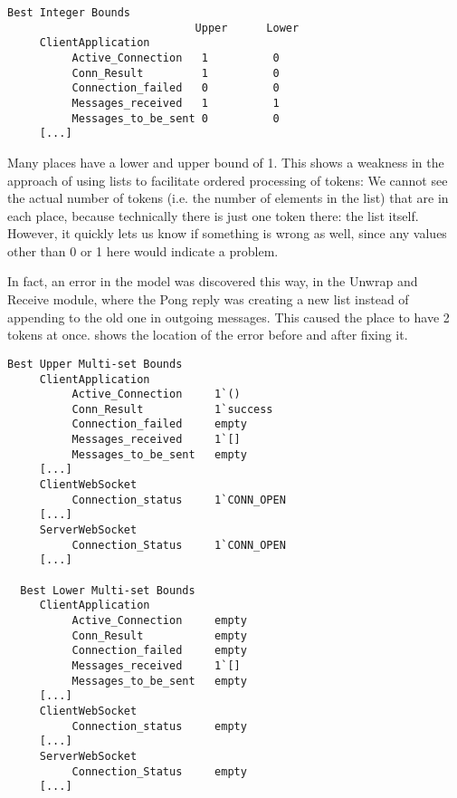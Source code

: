 	\begin{lstlisting}[language={},float=h,label=lst:ssa_bib,
	caption=State Space Report: Best Integer Bounds]
    Best Integer Bounds
                             Upper      Lower
     ClientApplication
          Active_Connection   1          0
          Conn_Result         1          0
          Connection_failed   0          0
          Messages_received   1          1
          Messages_to_be_sent 0          0
     [...]
	\end{lstlisting}
	
	Many places have a lower and upper bound of 1. This shows a weakness
	in the approach of using lists to facilitate ordered processing of tokens: We
	cannot see the actual number of tokens (i.e. the number of elements in the
	list) that are in each place, because technically there is just one token
	there: the list itself.
	However, it quickly lets us know if something is wrong as well, since any
	values other than 0 or 1 here would indicate a problem. 
	
	In fact, an error in the model was discovered this way, in the Unwrap and
	Receive module, where the Pong reply was creating a new list instead of
	appending to the old one in outgoing messages. This caused the  place to have 2 tokens at once.  shows the
	location of the error before and after fixing it.
	
	
	\begin{lstlisting}[language={},tabsize=4,float,label=lst:ssa_bmsb,
	caption=State Space Report: Best Multi-set Bounds]
  Best Upper Multi-set Bounds
     ClientApplication
          Active_Connection		1`()
          Conn_Result			1`success
          Connection_failed		empty
          Messages_received		1`[]
          Messages_to_be_sent	empty
     [...]
     ClientWebSocket
          Connection_status		1`CONN_OPEN
     [...]
     ServerWebSocket
          Connection_Status		1`CONN_OPEN
     [...]

  Best Lower Multi-set Bounds
     ClientApplication
          Active_Connection		empty
          Conn_Result			empty
          Connection_failed		empty
          Messages_received		1`[]
          Messages_to_be_sent	empty
     [...]
     ClientWebSocket
          Connection_status		empty
     [...]
     ServerWebSocket
          Connection_Status		empty
     [...]
	\end{lstlisting}
	
